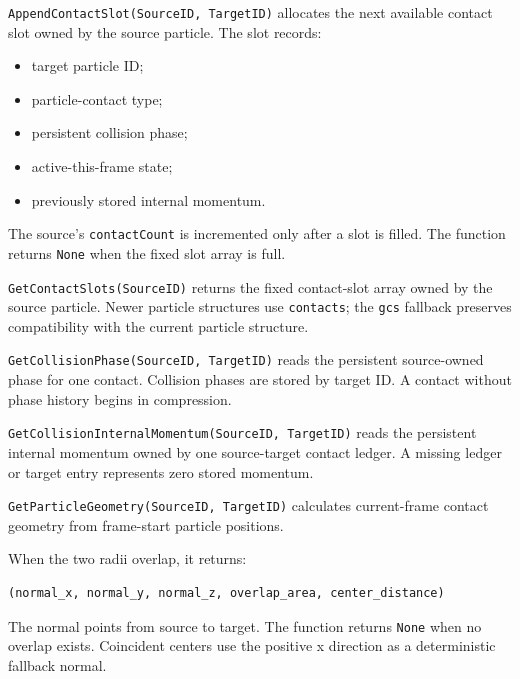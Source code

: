 
\texttt{AppendContactSlot(SourceID, TargetID)} allocates the next available
contact slot owned by the source particle.  The slot records:

\begin{itemize}
    \item target particle ID;
    \item particle-contact type;
    \item persistent collision phase;
    \item active-this-frame state;
    \item previously stored internal momentum.
\end{itemize}

The source's \texttt{contactCount} is incremented only after a slot is filled.
The function returns \texttt{None} when the fixed slot array is full.


\texttt{GetContactSlots(SourceID)} returns the fixed contact-slot array owned by
the source particle.  Newer particle structures use \texttt{contacts}; the
\texttt{gcs} fallback preserves compatibility with the current particle
structure.


\texttt{GetCollisionPhase(SourceID, TargetID)} reads the persistent
source-owned phase for one contact.  Collision phases are stored by target ID.
A contact without phase history begins in compression.


\texttt{GetCollisionInternalMomentum(SourceID, TargetID)} reads the persistent
internal momentum owned by one source-target contact ledger.  A missing ledger
or target entry represents zero stored momentum.


\texttt{GetParticleGeometry(SourceID, TargetID)} calculates current-frame
contact geometry from frame-start particle positions.

When the two radii overlap, it returns:

\begin{verbatim}
(normal_x, normal_y, normal_z, overlap_area, center_distance)
\end{verbatim}

The normal points from source to target.  The function returns \texttt{None}
when no overlap exists.  Coincident centers use the positive x direction as a
deterministic fallback normal.

